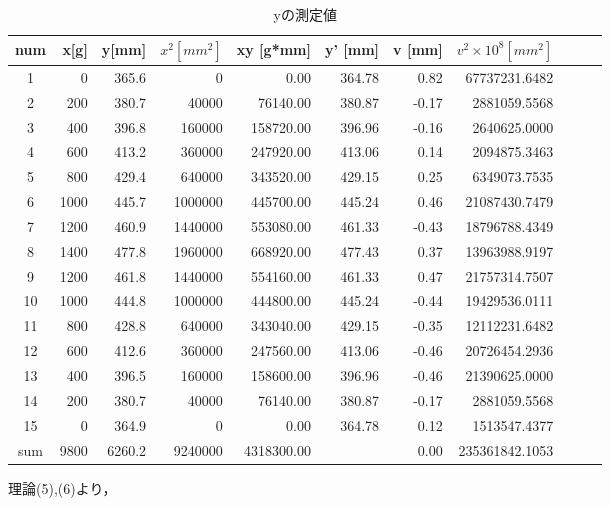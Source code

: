 \documentclass[a4paper,1pt]{jsarticle}
\begin{document}
\begin{table}[H]
  \caption{yの測定値}
  \label{table:SpeedOfLight}
  \centering
  \begin{tabular}{|c||r|r|r|r|r|r|r|r|r|r|}
    \hline
    num & x[g] & y[mm] & $x^2 [mm^2]$ & xy [g*mm] & y' [mm] & v [mm] & $v^2\times10^8 [mm^2]$ \\
    \hline\hline
    1 & 0 & 365.6 & 0 & 0.00 & 364.78 & 0.82 & 67737231.6482 \\
    2 & 200 & 380.7 & 40000 & 76140.00 & 380.87 & -0.17 & 2881059.5568 \\
    3 & 400 & 396.8 & 160000 & 158720.00 & 396.96 & -0.16 & 2640625.0000 \\
    4 & 600 & 413.2 & 360000 & 247920.00 & 413.06 & 0.14 & 2094875.3463 \\
    5 & 800 & 429.4 & 640000 & 343520.00 & 429.15 & 0.25 & 6349073.7535 \\
    6 & 1000 & 445.7 & 1000000 & 445700.00 & 445.24 & 0.46 & 21087430.7479 \\
    7 & 1200 & 460.9 & 1440000 & 553080.00 & 461.33 & -0.43 & 18796788.4349 \\
    8 & 1400 & 477.8 & 1960000 & 668920.00 & 477.43 & 0.37 & 13963988.9197 \\
    9 & 1200 & 461.8 & 1440000 & 554160.00 & 461.33 & 0.47 & 21757314.7507 \\
    10 & 1000 & 444.8 & 1000000 & 444800.00 & 445.24 & -0.44 & 19429536.0111 \\
    11 & 800 & 428.8 & 640000 & 343040.00 & 429.15 & -0.35 & 12112231.6482 \\
    12 & 600 & 412.6 & 360000 & 247560.00 & 413.06 & -0.46 & 20726454.2936 \\
    13 & 400 & 396.5 & 160000 & 158600.00 & 396.96 & -0.46 & 21390625.0000 \\
    14 & 200 & 380.7 & 40000 & 76140.00 & 380.87 & -0.17 & 2881059.5568 \\
    15 & 0 & 364.9 & 0 & 0.00 & 364.78 & 0.12 & 1513547.4377 \\

    \hline\hline
    sum & 9800 & 6260.2 & 9240000 & 4318300.00 &  & 0.00 & 235361842.1053 \\

    \hline
  \end{tabular}

\end{table}

理論(5),(6)より，\\
\end{document}

